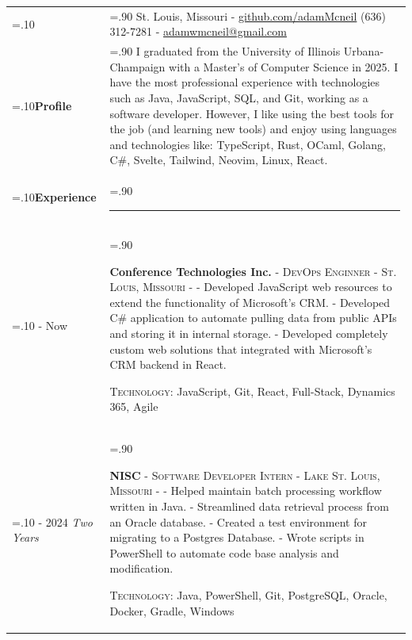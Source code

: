 \documentclass[10pt]{article}
\newcommand{\timeFrame}[3] {
  \if\relax\detokenize{#2}\relax
    #1
  \else
    #1 - #2
  \fi
  \newline
  \scriptsize \textit{#3}
}
\newcommand{\entry}[6] {
  \textbf{#1}
  \if\relax\detokenize{#2}\relax
  \else
       - \textsc{#2}
  \fi
  \if\relax\detokenize{#3}\relax
  \else
      - \textsc{#3}
  \fi
  \if\relax\detokenize{#4}\relax
  \else
      - \href{https://#4}{#4}
  \fi
  \newline #5
  \if\relax\detokenize{#6}\relax
  \else
      \newline \textsc{Technology:} #6
  \fi
  \\
}
\newcommand{\horizontalLine}[0] {
    \noindent\rule{.90\linewidth}{0.4pt}
}
\begin{document}

\begin{tabularx}{\linewidth}{>{\hsize=.10\hsize}X>{\hsize=.90\hsize}X}

{\bfseries\large Adam McNeil} &
St. Louis, Missouri - \href{https://github.com/adamMcneil}{github.com/adamMcneil}\newline
{(636) 312-7281 \hspace{5.5mm} - \href{mailto:adamwmcneil@gmail.com}{adamwmcneil@gmail.com}} \\[5pt]

\textbf{Profile} &
{
  I graduated from the University of Illinois Urbana-Champaign with a Master's of Computer Science in 2025.
  I have the most professional experience with technologies such as Java, JavaScript, SQL, and Git, working as a software developer.
  However, I like using the best tools for the job (and learning new tools) and enjoy using languages and technologies like: TypeScript, Rust, OCaml, Golang, C\#, Svelte, Tailwind, Neovim, Linux, React.
} \\

\textbf{Experience} & \horizontalLine \\

\timeFrame{2025}{Now}{} &
  \entry{Conference Technologies Inc.}
  {DevOps Enginner}
  {St. Louis, Missouri}
  {}
  {
  - Developed JavaScript web resources to extend the functionality of Microsoft's CRM. \newline
  - Developed C\# application to automate pulling data from public APIs and storing it in internal storage. \newline
  - Developed completely custom web solutions that integrated with Microsoft's CRM backend in React.
  }
  {JavaScript, Git, React, Full-Stack, Dynamics 365, Agile \newline}
\timeFrame{2023}{2024}{Two Years} &
\entry{NISC}
  {Software Developer Intern}
  {Lake St. Louis, Missouri}
  {}
  {
  - Helped maintain batch processing workflow written in Java. \newline
  - Streamlined data retrieval process from an Oracle database. \newline
  - Created a test environment for migrating to a Postgres Database. \newline
  - Wrote scripts in PowerShell to automate code base analysis and modification.
  }
  {Java, PowerShell, Git, PostgreSQL, Oracle, Docker, Gradle, Windows \newline}


\end{tabularx}
\end{document}
